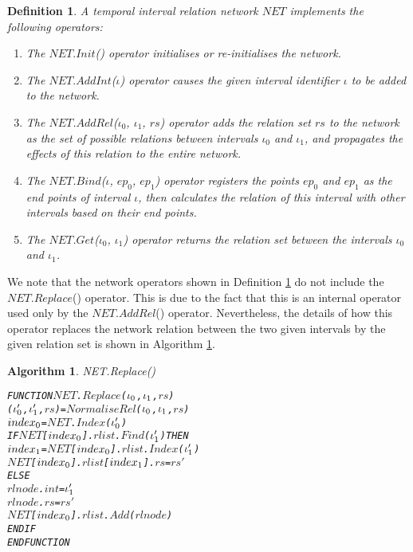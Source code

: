 \documentclass[11pt]{report}
\newtheorem{vdefinition}{Definition}[chapter]
\newenvironment{vverbatim}
{
  \begin{alltt}
}
{
    \vspace{-\baselineskip}
  \end{alltt}
}
\newtheorem{vvalgorithm}{Algorithm}[chapter]
\newenvironment{valgorithm}[2]
{
  \begin{vvalgorithm}{#1}
    \label{#2}
    \small
    \begin{vverbatim}
}
{
    \end{vverbatim}
  \end{vvalgorithm}
}
\begin{document}
        \begin{vdefinition}
          \label{defn-impln-netop}
          A temporal interval relation network $NET$ implements the following
          operators:

          \begin{enumerate}
            \item
              The $NET.Init$() operator initialises or re-initialises the
              network.

            \item
              The $NET.AddInt$($\iota$) operator causes the given interval
              identifier $\iota$ to be added to the network.

            \item
              The $NET$.$AddRel$($\iota_0$, $\iota_1$, $rs$) operator adds the
              relation set $rs$ to the network as the set of possible
              relations between intervals $\iota_0$ and $\iota_1$, and
              propagates the effects of this relation to the entire network.

            \item
              The $NET$.$Bind$($\iota$, $ep_0$, $ep_1$) operator registers the
              points $ep_0$ and $ep_1$ as the end points of interval $\iota$,
              then calculates the relation of this interval with other
              intervals based on their end points.

            \item
              The $NET$.$Get$($\iota_0$, $\iota_1$) operator returns the
              relation set between the intervals $\iota_0$ and $\iota_1$.
          \end{enumerate}
        \end{vdefinition}

        We note that the network operators shown in Definition
        \ref{defn-impln-netop} do not include the $NET.Replace$() operator.
        This is due to the fact that this is an internal operator used only by
        the $NET.AddRel$() operator. Nevertheless, the details of how this
        operator replaces the network relation between the two given intervals
        by the given relation set is shown in Algorithm \ref{algo-impln-ntrep}.

        \begin{valgorithm}{NET.Replace()}{algo-impln-ntrep}
FUNCTION \(NET\).\(Replace\)(\(\iota\sb{0}\), \(\iota\sb{1}\), \(rs\))
  (\(\iota\sb{0}'\), \(\iota\sb{1}'\), \(rs\)) = \(NormaliseRel\)(\(\iota\sb{0}\), \(\iota\sb{1}\), \(rs\))
  \(index\sb{0}\) = \(NET\).\(Index\)(\(\iota\sb{0}'\))
  IF \(NET\)[\(index\sb{0}\)].\(rlist\).\(Find\)(\(\iota\sb{1}'\)) THEN
    \(index\sb{1}\) = \(NET\)[\(index\sb{0}\)].\(rlist\).\(Index\)(\(\iota\sb{1}'\))
    \(NET\)[\(index\sb{0}\)].\(rlist\)[\(index\sb{1}\)].\(rs\) = \(rs'\)
  ELSE
    \(rlnode\).\(int\) = \(\iota\sb{1}'\)
    \(rlnode\).\(rs\) = \(rs'\)
    \(NET\)[\(index\sb{0}\)].\(rlist\).\(Add\)(\(rlnode\))
  ENDIF
ENDFUNCTION
        \end{valgorithm}
\end{document}

